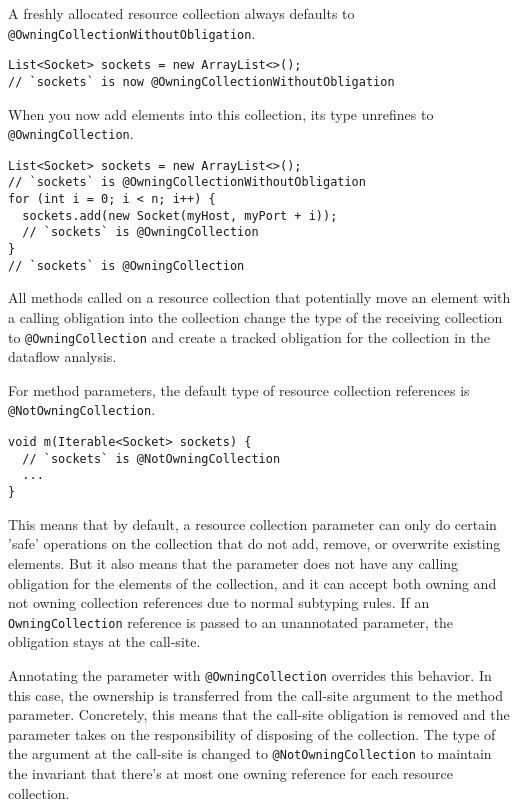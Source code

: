 
A freshly allocated resource collection always defaults to \texttt{@OwningCollectionWithoutObligation}.

\begin{Verbatim}
List<Socket> sockets = new ArrayList<>();
// `sockets` is now @OwningCollectionWithoutObligation
\end{Verbatim}

When you now add elements into this collection, its type unrefines to \texttt{@OwningCollection}.

\begin{Verbatim}
List<Socket> sockets = new ArrayList<>();
// `sockets` is @OwningCollectionWithoutObligation
for (int i = 0; i < n; i++) {
  sockets.add(new Socket(myHost, myPort + i));
  // `sockets` is @OwningCollection
}
// `sockets` is @OwningCollection
\end{Verbatim}

All methods called on a resource collection that potentially move an element with a calling obligation into the collection change the type of the receiving collection to \texttt{@OwningCollection} and create a tracked obligation for the collection in the dataflow analysis.

For method parameters, the default type of resource collection references is \texttt{@NotOwningCollection}.

\begin{Verbatim}
void m(Iterable<Socket> sockets) {
  // `sockets` is @NotOwningCollection
  ...
}
\end{Verbatim}

This means that by default, a resource collection parameter can only do certain 'safe' operations on the collection that do not add, remove, or overwrite existing elements. But it also means that the parameter does not have any calling obligation for the elements of the collection, and it can accept both owning and not owning collection references due to normal subtyping rules. If an \texttt{OwningCollection} reference is passed to an unannotated parameter, the obligation stays at the call-site.

Annotating the parameter with \texttt{@OwningCollection} overrides this behavior. In this case, the ownership is transferred from the call-site argument to the method parameter. Concretely, this means that the call-site obligation is removed and the parameter takes on the responsibility of disposing of the collection. The type of the argument at the call-site is changed to \texttt{@NotOwningCollection} to maintain the invariant that there's at most one owning reference for each resource collection.

